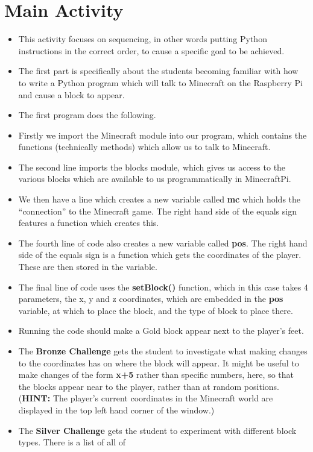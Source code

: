 \documentclass{geocraft-lesson-plan}
\begin{document}
\section*{Main Activity}
\begin{itemize}
\item This activity focuses on sequencing, in other words putting Python instructions in the correct order, to cause a
  specific goal to be achieved.
\item The first part is specifically about the students becoming familiar with how to write a Python program which will
  talk to Minecraft on the Raspberry Pi and cause a block to appear.
\item The first program does the following.
\item Firstly we import the Minecraft module into our program, which contains the functions (technically methods) which
  allow us to talk to Minecraft.
\item The second line imports the blocks module, which gives us access to the various blocks which are available to us
 programmatically in MinecraftPi. 
\item We then have a line which creates a new variable called \textbf{mc} which holds the ``connection'' to the
  Minecraft game. The right hand side of the equals sign features a function which creates this.
\item The fourth line of code also creates a new variable called \textbf{pos}. The right hand side of the equals sign is
  a function which gets the coordinates of the player. These are then stored in the variable.
\item The final line of code uses the \textbf{setBlock()} function, which in this case takes 4 parameters, the x, y and
  z coordinates, which are embedded in the \textbf{pos} variable, at which to place the block, and the type of block to
  place there. 
\item Running the code should make a Gold block appear next to the player's feet.
\item The \textbf{Bronze Challenge} gets the student to investigate what making changes to the coordinates has on where
  the block will appear. It might be useful to make changes of the form \textbf{x+5} rather than specific numbers, here,
  so that the blocks appear near to the player, rather than at random positions. (\textbf{HINT:} The player's current
  coordinates in the Minecraft world are displayed in the top left hand corner of the window.)
\item The \textbf{Silver Challenge} gets the student to experiment with different block types. There is a list of all of

\end{itemize}
\end{document}
